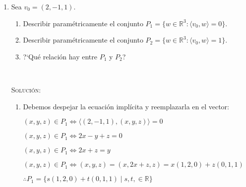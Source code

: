 \documentclass[a4paper,12pt,twoside,spanish,reqno]{amsbook}
\numberwithin{equation}{section}
\newcommand{\rta}{\noindent\textsc{Solución: }}
\begin{document}
\begin{enumerate}[resume]
\rta Para el cálculo numérico, notar que las ecuaciones de las tres rectas son de la forma $x+3y = c$ donde $c$ vale 2, 0 y 1 para $R_1$, $R_2$ y $R_3$ respectivamente. Así tendremos por ejemplo que para calcular la intersección $R_1\cap R_2$ tendremos que resolver el sistema:

\begin{equation*}
\left\{\begin{array}{l}
x+3y=2 \\
x+3y=0
\end{array} \right.
\end{equation*}

Este sistema no tiene solución, pues para cualquier valores de $x$ e $y$ que elijamos, no puede suceder que al hacer la cuenta $x+3y$ obtengamos simultáneamente el resultado 2 y el resultado 0. El caso $R_1\cap R_3$ es análogo.  

Para la determinación gráfica, se pueden observar los gráficos de la figura \ref{ej13by14} y notar que ambas parejas son paralelas, y por lo tanto no tienen intersección.

En conclusión, tenemos $\boxed{ R_1 \cap R_2 = R_1 \cap R_3 = \emptyset }$

\

\item Sea $v_0=(2,-1,1)$.
\begin{enumerate}
	\item Describir param{\'e}tricamente el conjunto
	$P_1=\{w\in\mathbb{ R}^3:\langle v_0 , w  \rangle=0\}$.
	\item Describir param{\'e}tricamente el conjunto
	$P_2=\{w\in\mathbb{ R}^3:\langle v_0 , w  \rangle=1\}$.
	\item ?`Qu\'e relaci\'on hay entre $P_1$ y $P_2$?
\end{enumerate}

\

\rta

\begin{enumerate}
	\item Debemos despejar la ecuación implícita y reemplazarla en el vector:

$ (x,y,z) \in P_1 \iff \langle (2,-1,1) , (x,y,z) \rangle = 0$
	
$ (x,y,z) \in P_1 \iff 2x-y+z = 0$	

$ (x,y,z) \in P_1 \iff 2x+z = y$	

$ (x,y,z) \in P_1 \iff (x,y,z) = (x,2x+z,z) = x (1,2,0) + z (0,1,1)$	

$ \therefore \boxed{ P_1 = \{ s (1,2,0) + t (0,1,1) \; | \; s,t, \in \mathbb{R} \} }$
	

\end{enumerate}
\end{enumerate}
\end{document}
